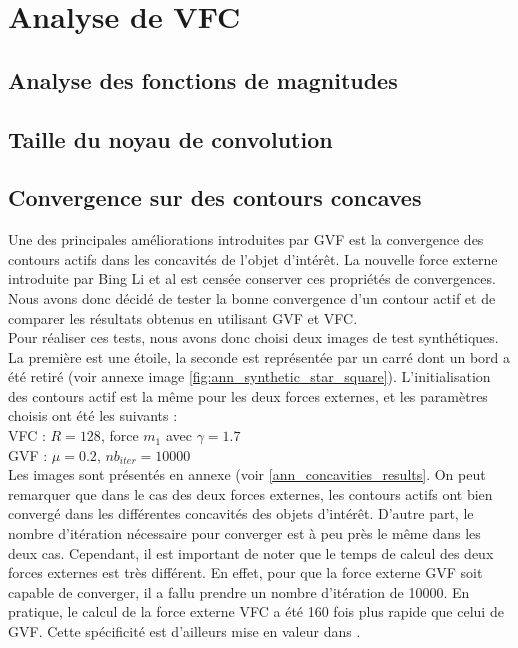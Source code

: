 
\section{Analyse de VFC}
\subsection{Analyse des fonctions de magnitudes}
\subsection{Taille du noyau de convolution}
\subsection{Convergence sur des contours concaves}
Une des principales améliorations introduites par GVF est la convergence des contours actifs dans les concavités de l'objet d'intérêt. La nouvelle force externe introduite par Bing Li et al est censée conserver ces propriétés de convergences. Nous avons donc décidé de tester la bonne convergence d'un contour actif et de comparer les résultats obtenus en utilisant GVF et VFC.\\ %

Pour réaliser ces tests, nous avons donc choisi deux images de test synthétiques. La première est une étoile, la seconde est représentée par un carré dont un bord a été retiré (voir annexe image \ref{fig:ann_synthetic_star_square}). L'initialisation des contours actif est la même pour les deux forces externes, et les paramètres choisis ont été les suivants :\\

VFC : $R = 128$, force $m_{1}$ avec $\gamma = 1.7$\\
GVF : $\mu = 0.2$, $nb_{iter} = 10000$\\

Les images sont présentés en annexe (voir \ref{ann_concavities_results}. On peut remarquer que dans le cas des deux forces externes, les contours actifs ont bien convergé dans les différentes concavités des objets d'intérêt. D'autre part, le nombre d'itération nécessaire pour converger est à peu près le même dans les deux cas. Cependant, il est important de noter que le temps de calcul des deux forces externes est très différent. En effet, pour que la force externe GVF soit capable de converger, il a fallu prendre un nombre d'itération de 10000. En pratique, le calcul de la force externe VFC a été 160 fois plus rapide que celui de GVF. Cette spécificité est d'ailleurs mise en valeur dans \cite{vfc}. 


